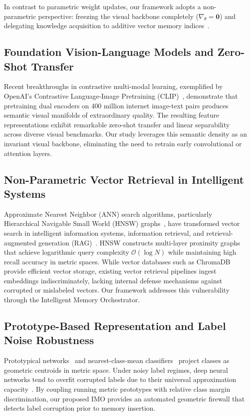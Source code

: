 \documentclass[sn-mathphys,Numbered]{sn-jnl}
\begin{document}
In contrast to parametric weight updates, our framework adopts a non-parametric perspective: freezing the visual backbone completely ($\nabla_\theta = \mathbf{0}$) and delegating knowledge acquisition to additive vector memory indices~\cite{mensink2013distance}.

\subsection{Foundation Vision-Language Models and Zero-Shot Transfer}
Recent breakthroughs in contrastive multi-modal learning, exemplified by OpenAI's Contrastive Language-Image Pretraining (CLIP)~\cite{radford2021learning}, demonstrate that pretraining dual encoders on 400 million internet image-text pairs produces semantic visual manifolds of extraordinary quality. The resulting feature representations exhibit remarkable zero-shot transfer and linear separability across diverse visual benchmarks. Our study leverages this semantic density as an invariant visual backbone, eliminating the need to retrain early convolutional or attention layers.

\subsection{Non-Parametric Vector Retrieval in Intelligent Systems}
Approximate Nearest Neighbor (ANN) search algorithms, particularly Hierarchical Navigable Small World (HNSW) graphs~\cite{malkov2018efficient}, have transformed vector search in intelligent information systems, information retrieval, and retrieval-augmented generation (RAG)~\cite{guu2020retrieval,lewis2020retrieval,johnson2019billion}. HNSW constructs multi-layer proximity graphs that achieve logarithmic query complexity $\mathcal{O}(\log N)$ while maintaining high recall accuracy in metric spaces. While vector databases such as ChromaDB provide efficient vector storage, existing vector retrieval pipelines ingest embeddings indiscriminately, lacking internal defense mechanisms against corrupted or mislabeled vectors. Our framework addresses this vulnerability through the Intelligent Memory Orchestrator.

\subsection{Prototype-Based Representation and Label Noise Robustness}
Prototypical networks~\cite{snell2017prototypical} and nearest-class-mean classifiers~\cite{mensink2013distance} project classes as geometric centroids in metric space. Under noisy label regimes, deep neural networks tend to overfit corrupted labels due to their universal approximation capacity~\cite{han2018co,patrini2017making}. By coupling running metric prototypes with relative class margin discrimination, our proposed IMO provides an automated geometric firewall that detects label corruption prior to memory insertion.
\end{document}
